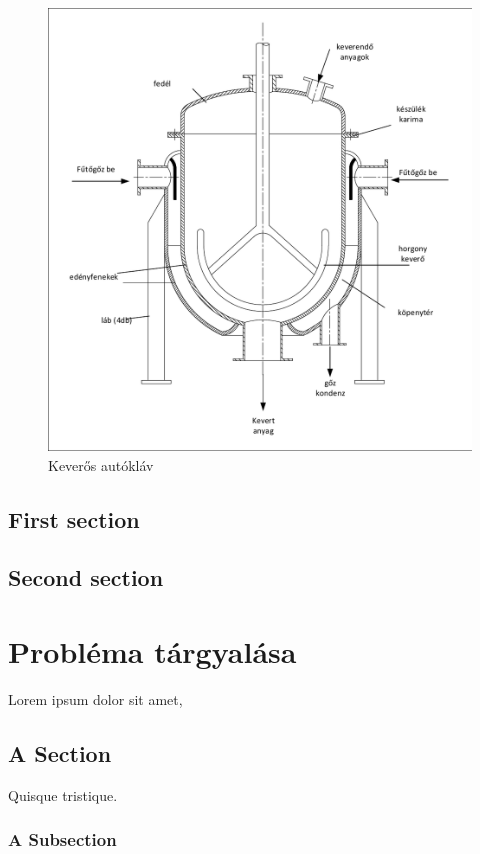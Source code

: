\documentclass[a4paper,12pt,oneside]{book}
\begin{document}
\begin{figure}[H]
	\centering
	\includegraphics[scale=1, trim=1mm 1mm 1mm 1mm, clip]{kep1}
	\caption{Keverős autókláv}
	\label{kep1356}
\end{figure}




\section{First section}

\section{Second section}

\chapter{Probléma tárgyalása}
Lorem ipsum dolor sit amet,

\section{A Section}

Quisque tristique.

\subsection{A Subsection}
\end{document}
